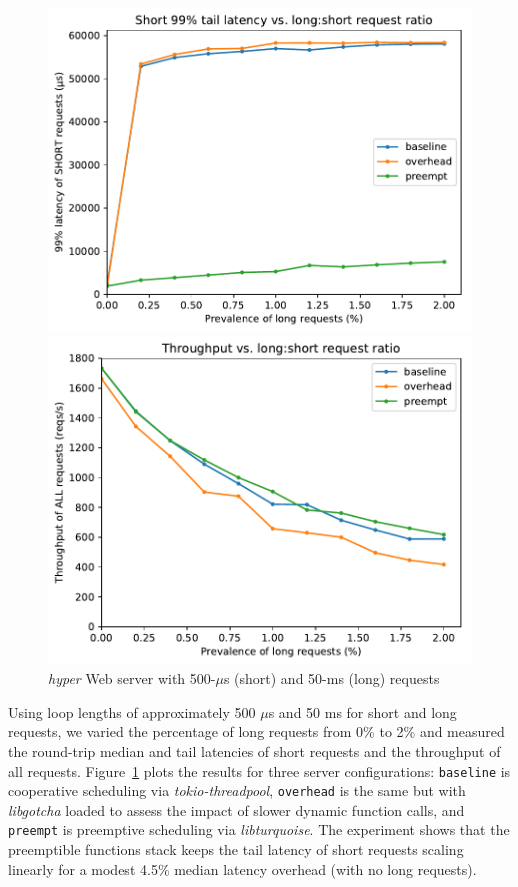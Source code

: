 \begin{figure}
	\begin{minipage}{\columnwidth}
	\includegraphics[width=\textwidth]{figs/twooom_99-short}
	\end{minipage}
%
	\begin{minipage}{\columnwidth}
	\includegraphics[width=\textwidth]{figs/twooom_tput}
	\end{minipage}
\caption{\textit{hyper} Web server with 500-$\mu$s (short) and 50-ms (long) requests}
\label{fig:hyper}
\end{figure}

Using loop lengths of approximately 500 $\mu$s and 50 ms for short and long requests,
we varied the percentage of long requests from 0\% to 2\% and measured the round-trip
median and tail latencies of short requests and the throughput of all requests.
Figure~\ref{fig:hyper} plots the results for three server configurations:\@
\texttt{baseline} is cooperative scheduling via \textit{tokio-threadpool},
\texttt{overhead} is the same but with \textit{libgotcha} loaded to assess the
impact of slower dynamic function calls, and \texttt{preempt} is preemptive
scheduling via \textit{libturquoise}.  The experiment shows that the preemptible
functions stack keeps the tail latency of short requests scaling linearly for a
modest 4.5\% median latency overhead (with no long requests).

